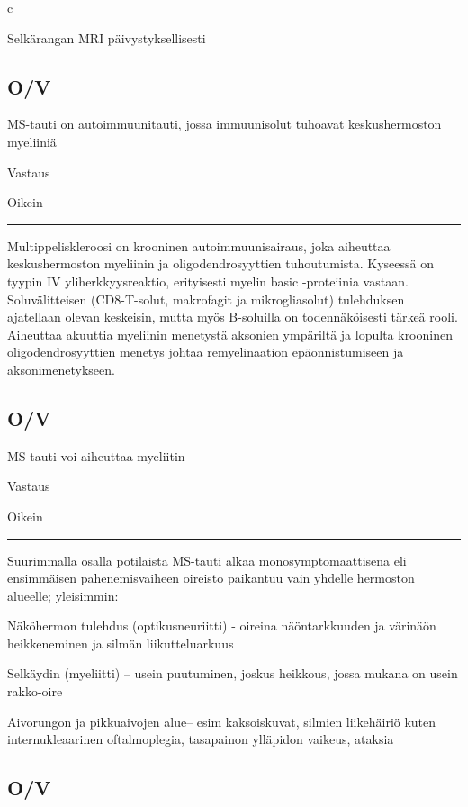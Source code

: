 \documentclass[
]{book}
\begin{document}
c

Selkärangan MRI päivystyksellisesti

\subsection{O/V}\label{ov-16}

MS-tauti on autoimmuunitauti, jossa immuunisolut tuhoavat keskushermoston myeliiniä

Vastaus

Oikein

\begin{center}\rule{0.5\linewidth}{0.5pt}\end{center}

Multippeliskleroosi on krooninen autoimmuunisairaus, joka aiheuttaa keskushermoston myeliinin ja oligodendrosyyttien tuhoutumista. Kyseessä on tyypin IV yliherkkyysreaktio, erityisesti myelin basic -proteiinia vastaan. Soluvälitteisen (CD8-T-solut, makrofagit ja mikrogliasolut) tulehduksen ajatellaan olevan keskeisin, mutta myös B-soluilla on todennäköisesti tärkeä rooli. Aiheuttaa akuuttia myeliinin menetystä aksonien ympäriltä ja lopulta krooninen oligodendrosyyttien menetys johtaa remyelinaation epäonnistumiseen ja aksonimenetykseen.

\subsection{O/V}\label{ov-17}

MS-tauti voi aiheuttaa myeliitin

Vastaus

Oikein

\begin{center}\rule{0.5\linewidth}{0.5pt}\end{center}

Suurimmalla osalla potilaista MS-tauti alkaa monosymptomaattisena eli ensimmäisen pahenemisvaiheen oireisto paikantuu vain yhdelle hermoston alueelle; yleisimmin:

Näköhermon tulehdus (optikusneuriitti) - oireina näöntarkkuuden ja värinäön heikkeneminen ja silmän liikutteluarkuus

Selkäydin (myeliitti) -- usein puutuminen, joskus heikkous, jossa mukana on usein rakko-oire

Aivorungon ja pikkuaivojen alue-- esim kaksoiskuvat, silmien liikehäiriö kuten internukleaarinen oftalmoplegia, tasapainon ylläpidon vaikeus, ataksia

\subsection{O/V}\label{ov-18}
\end{document}
